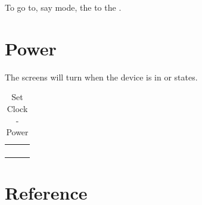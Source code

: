 To go to, say  mode,  the  to the .


\section{Power}

The screens will turn  when the device is in  or 
states.

\begin{table}[H]
\begin{tabu}{ X[1,c,m] | X[1,c,m] | X[1,c,m] }
  \thrule
   &  &  \\ \mrule

   & 
    &  \\ 
   & & \\

  \bhrule
\end{tabu}
\caption {Set Clock - Power}
\end{table}

\section{Reference} \label{Set Clock - Reference}

